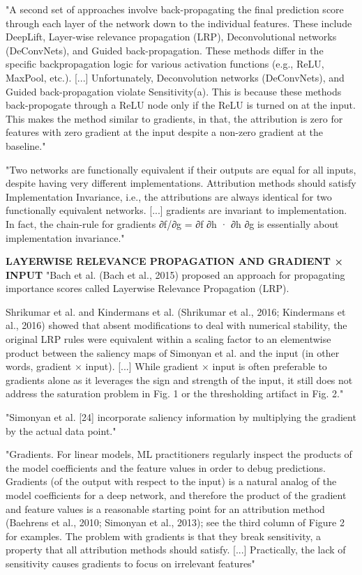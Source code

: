 		"A second set of approaches involve back-propagating the final prediction score through each layer of the network down to the individual features. These include DeepLift, Layer-wise relevance propagation (LRP), Deconvolutional networks (DeConvNets), and Guided back-propagation. These methods differ in the specific backpropagation logic for various activation functions (e.g., ReLU, MaxPool, etc.).
		[...]
		Unfortunately, Deconvolution networks (DeConvNets), and Guided back-propagation violate Sensitivity(a). This is because these methods back-propogate through a ReLU node only if the ReLU is turned on at the input. This makes the method similar to gradients, in that, the attribution is zero for features with zero gradient at the input despite a non-zero gradient at the baseline." \cite{Sundararajan2017}
		
		"Two networks are functionally equivalent if their outputs are equal for all inputs, despite having very different implementations. Attribution methods should satisfy Implementation Invariance, i.e., the attributions are always identical for two functionally equivalent networks.
		[...]
		gradients are invariant to implementation. In fact, the chain-rule for gradients ∂f/∂g = ∂f ∂h · ∂h ∂g is essentially about implementation invariance." \cite{Sundararajan2017}
		
		\textbf{LAYERWISE RELEVANCE PROPAGATION AND GRADIENT × INPUT}
			"Bach et al. (Bach et al., 2015) proposed an approach for propagating importance scores called Layerwise Relevance Propagation (LRP).
			
			Shrikumar et al. and Kindermans et al. (Shrikumar et al., 2016; Kindermans et al., 2016) showed that absent modifications to deal with numerical stability, the original LRP rules were equivalent within a scaling factor to an elementwise product between the saliency maps of Simonyan et al. and the input (in other words, gradient × input).
			[...]
			While gradient × input is often preferable to gradients alone as it leverages the sign and strength of the input, it still does not address the saturation problem in Fig. 1 or the thresholding artifact in Fig. 2." \cite{Shrikumar2017}
			
			"Simonyan et al. [24] incorporate saliency information by multiplying the gradient by the actual data point." \cite{Montavon2017}
			
			"Gradients. For linear models, ML practitioners regularly inspect the products of the model coefficients and the feature values in order to debug predictions. Gradients (of the output with respect to the input) is a natural analog of the model coefficients for a deep network, and therefore the product of the gradient and feature values is a reasonable starting point for an attribution method (Baehrens et al., 2010; Simonyan et al., 2013); see the third column of Figure 2 for examples. The problem with gradients is that they break sensitivity, a property that all attribution methods should satisfy.
			[...]
			Practically, the lack of sensitivity causes gradients to focus on irrelevant features" \cite{Sundararajan2017}
			
